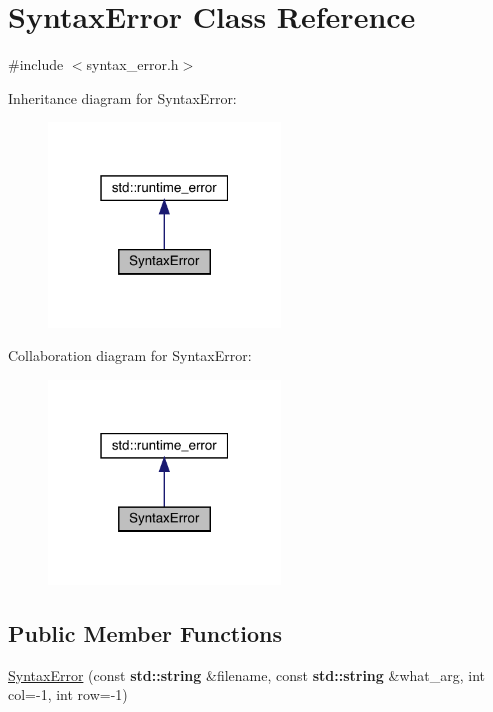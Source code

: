 \hypertarget{class_syntax_error}{}\section{Syntax\+Error Class Reference}
\label{class_syntax_error}


{\ttfamily \#include $<$syntax\+\_\+error.\+h$>$}



Inheritance diagram for Syntax\+Error\+:\nopagebreak
\begin{figure}[H]
\begin{center}
\leavevmode
\includegraphics[width=175pt]{class_syntax_error__inherit__graph}
\end{center}
\end{figure}


Collaboration diagram for Syntax\+Error\+:\nopagebreak
\begin{figure}[H]
\begin{center}
\leavevmode
\includegraphics[width=175pt]{class_syntax_error__coll__graph}
\end{center}
\end{figure}
\subsection*{Public Member Functions}
\begin{DoxyCompactItemize}
\item 
\hyperlink{class_syntax_error_a16dc968369bcbe16544f01e53dfd97d0}{Syntax\+Error} (const \textbf{ std\+::string} \&filename, const \textbf{ std\+::string} \&what\+\_\+arg, int col=-\/1, int row=-\/1)
\end{DoxyCompactItemize}


